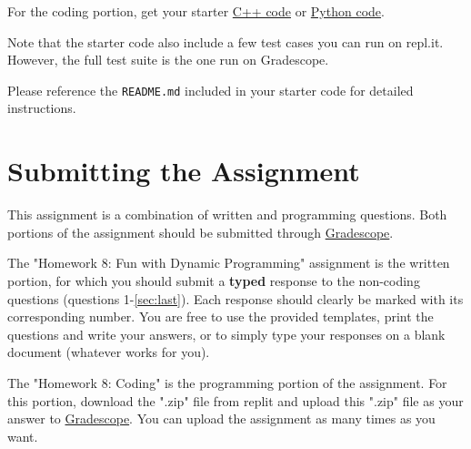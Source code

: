 \documentclass [12pt]{article}
\begin{document}
For the coding portion, get your starter \href{https://replit.com/team/COMP285/HW7-Code}{C++ code} or \href{https://replit.com/team/COMP285/HW7-Code-Python}{Python code}.

Note that the starter code also include a few test cases you can run on repl.it. However, the full test suite is the one run on Gradescope.

Please reference the \texttt{README.md} included in your starter code for detailed instructions.

\section*{Submitting the Assignment}

This assignment is a combination of written and programming questions. Both portions of the assignment should be submitted through \href{https://www.gradescope.com/courses/350304}{Gradescope}.

The "Homework 8: Fun with Dynamic Programming" assignment is the written portion, for which you should submit a \textbf{typed} response to the non-coding questions (questions 1-\ref{sec:last}). Each response should clearly be marked with its corresponding number. You are free to use the provided templates, print the questions and write your answers, or to simply type your responses on a blank document (whatever works for you).

The "Homework 8: Coding" is the programming portion of the assignment. For this portion, download the ".zip" file from replit and upload this ".zip" file as your answer to \href{https://www.gradescope.com/courses/350304}{Gradescope}. You can upload the assignment as many times as you want.
\end{document}

